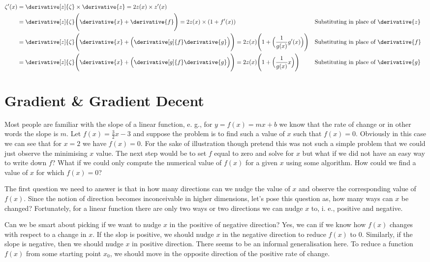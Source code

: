 \documentclass{homework}
\begin{document}
\begin{align*}
  \zeta'(x)
  & = \derivative[z]{\zeta} \times \derivative{z}
    = 2z(x) \times z'(x) \\
  & = \derivative[z]{\zeta} \Bigg(\derivative{x} + \derivative{f}\Bigg)
    = 2z(x) \times (1 + f'(x))
      && \text{Substituting in place of } \derivative{z} \\
  & = \derivative[z]{\zeta} \Bigg(\derivative{x} + \Big(\derivative[g]{f} \derivative{g} \Big)\Bigg)
    = 2z(x)\Bigg(1 + \Big(\frac{1}{g(x)}g'(x)\Big)\Bigg)
      && \text{Substituting in place of } \derivative{f} \\
  & = \derivative[z]{\zeta} \Bigg(\derivative{x} + \Big(\derivative[g]{f} \derivative{g} \Big)\Bigg)
    = 2z(x)\Bigg(1 + \Big(\frac{1}{g(x)}x\Big)\Bigg)
      && \text{Substituting in place of } \derivative{g} \\
\end{align*}

\section{Gradient \& Gradient Decent}

Most people are familiar with the slope of a linear function, e. g., for $y = f(x) = mx +b$ we know that the rate of change or in other words the slope is $m$. Let $f(x) = \frac{3}{2}x - 3$ and suppose the problem is to find such a value of $x$ such that $f(x) = 0$. Obviously in this case we can see that for $x=2$ we have $f(x) = 0$. For the sake of illustration though pretend this was not such a simple problem that we could just observe the minimising $x$ value. The next step would be to set $f$ equal to zero and solve for $x$ but what if we did not have an easy way to write down $f$? What if we could only compute the numerical value of $f(x)$ for a given $x$ using some algorithm. How could we find a value of $x$ for which $f(x) = 0$?

The first question we need to answer is that in how many directions can we nudge the value of $x$ and observe the corresponding value of $f(x)$. Since the notion of direction becomes inconceivable in higher dimensions, let's pose this question as, how many ways can $x$ be changed? Fortunately, for a linear function there are only two ways or two directions we can nudge $x$ to, i. e., positive and negative.

Can we be smart about picking if we want to nudge $x$ in the positive of negative direction? Yes, we can if we know how $f(x)$ changes with respect to a change in $x$. If the slop is positive, we should nudge $x$ in the negative direction to reduce $f(x)$ to 0. Similarly, if the slope is negative, then we should nudge $x$ in positive direction. There seems to be an informal generalisation here. To reduce a function $f(x)$ from some starting point $x_0$, we should move in the opposite direction of the positive rate of change.
\end{document}
